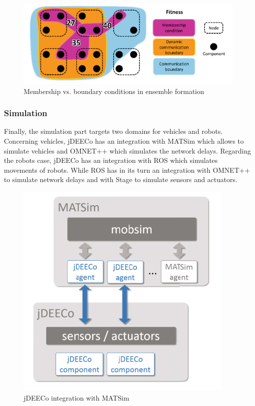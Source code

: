 \begin{figure}[!htb]
\centering
\includegraphics[scale=0.60]{figures/fitness}
\caption{Membership vs. boundary conditions in ensemble formation}
\label{fig:fitness}
\end{figure}

\subsubsection{Simulation}
Finally, the simulation part targets two domains for vehicles\cite{Kit:2015:AFE:2821357.2821374} and robots\cite{Matena:2016:MPT:2897053.2897065}. Concerning vehicles, jDEECo has an integration with MATSim which allows to simulate vehicles and OMNET++ which simulates the network delays. Regarding the robots case, jDEECo has an integration with ROS which simulates movements of robots. While ROS has in its turn an integration with OMNET++ to simulate network delays and with Stage to simulate sensors and actuators.

\begin{figure}[!htb]
\centering
\includegraphics[scale=0.55]{figures/matsim}
\caption{jDEECo integration with MATSim}
\label{fig:matsim}
\end{figure}


